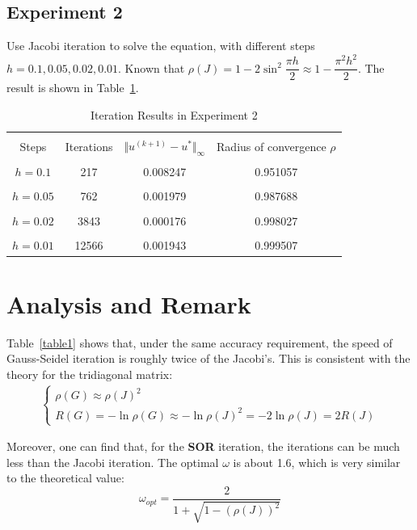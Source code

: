 \documentclass[a4paper,11pt]{article}
\begin{document}
\subsection{Experiment 2}
Use Jacobi iteration to solve the equation, with different steps $h=0.1,0.05,0.02,0.01$. Known that $\rho(J)=1-2\sin^{2}\dfrac{\pi h}{2}\approx 1-\dfrac{\pi^2 h^2}{2}$. The result is shown in Table~\ref{table2}.
\begin{table}[t]
    \centering
    \caption{Iteration Results in Experiment 2}
    \label{table2}
    \begin{tabular}{|c|c|c|c|}
        \hline
        & & & \\[-6pt]
        Steps&Iterations&$\Vert u^{(k+1)}-u^{*}\Vert_\infty$&Radius of convergence $\rho$ \\
        \hline
        & & & \\[-6pt]
        $h=0.1$&217&0.008247&0.951057\\
        \hline
        & & & \\[-6pt]
        $h=0.05$&762&0.001979&0.987688\\
        \hline
        & & & \\[-6pt]
        $h=0.02$&3843&0.000176&0.998027\\
        \hline
        & & & \\[-6pt]
        $h=0.01$&12566&0.001943&0.999507\\
        \hline
    \end{tabular}
\end{table}

\section{Analysis and Remark}
Table~\ref{table1} shows that, under the same accuracy requirement, the speed of Gauss-Seidel iteration is roughly twice of the Jacobi's. This is consistent with the theory for the tridiagonal matrix:
\begin{eqnarray}
    \begin{cases}
        \rho(G)\approx\rho(J)^2 \\
        R(G)=-\ln{\rho(G)}\approx-\ln{\rho(J)^2}=-2\ln{\rho(J)}=2R(J)
    \end{cases}
\end{eqnarray}

Moreover, one can find that, for the \textbf{SOR} iteration, the iterations can be much less than the Jacobi iteration. The optimal $\omega$ is about 1.6, which is very similar to the theoretical value:
\begin{equation}
    \omega_{opt}=\dfrac{2}{1+\sqrt{1-(\rho(J))^2}}
\end{equation}
\end{document}
